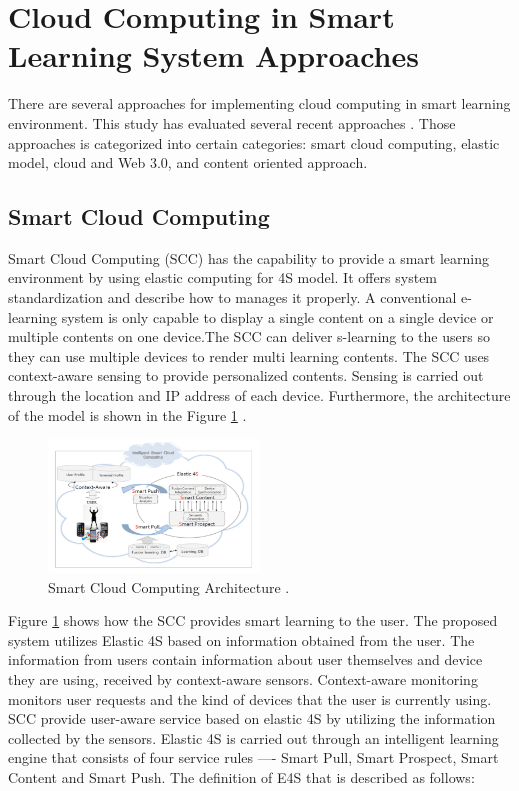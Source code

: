\documentclass[journal]{vgtc}
\begin{document}
\section{Cloud Computing in Smart Learning System Approaches}
There are several approaches for implementing cloud computing in smart learning environment. This study has evaluated several recent approaches \cite{Kim2013,s110807835,jeong2013content,jeong2013cloud,nasr2012proposed}. Those approaches is categorized into certain categories: smart cloud computing, elastic model, cloud and Web 3.0, and content oriented approach.

  \subsection{Smart Cloud Computing}
  Smart Cloud Computing (SCC) has the capability to provide a smart learning environment by using elastic computing for 4S model. It offers system standardization and describe how to manages it properly. A conventional e-learning system is only capable to display a single content on a single device or multiple contents on one device.The SCC can deliver s-learning to the users so they can use multiple devices to render multi learning contents. The SCC uses context-aware sensing to provide personalized contents. Sensing is carried out through the location and IP address of each device. Furthermore, the architecture of the model is shown in the Figure \ref{scc} \cite{s110807835}.

  \begin{figure}[t]
    \centering
    \includegraphics[width=0.5\textwidth]{scc}
    \caption{Smart Cloud Computing Architecture \cite{s110807835}.}
    \label{scc}
  \end{figure}

  Figure \ref{scc} shows how the SCC provides smart learning to the user. The proposed system utilizes Elastic 4S based on information obtained from the user. The information from users contain information about user themselves and device they are using, received by context-aware sensors. Context-aware monitoring monitors user requests and the kind of devices that the user is currently using. SCC provide user-aware service based on elastic 4S by utilizing the information collected by the sensors. Elastic 4S is carried out through an intelligent learning engine that consists of four service rules —- Smart Pull, Smart Prospect, Smart Content and Smart Push. The definition of E4S that is described as follows:
\end{document}
